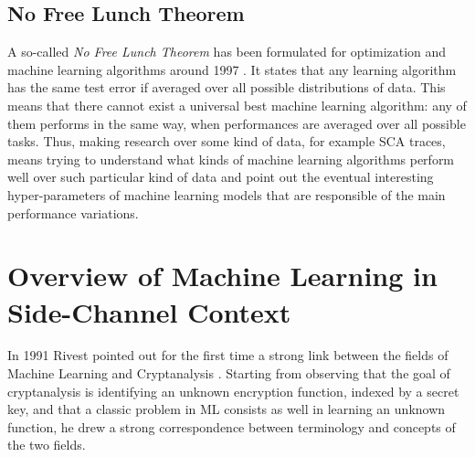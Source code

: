 \subsection{No Free Lunch Theorem}\label{sec:NFL}
A so-called \emph{No Free Lunch Theorem} has been formulated for optimization and machine learning algorithms around 1997 \cite{wolpert1997no}. It states that any learning algorithm has the same test error if averaged over all possible distributions of data. This means that there cannot exist a universal best machine learning algorithm: any of them performs in the same way, when performances are averaged over all possible tasks. Thus, making research over some kind of data, for example SCA traces, means trying to understand what kinds of machine learning algorithms perform well over such particular kind of data and point out the eventual interesting hyper-parameters of machine learning models that are responsible of the main performance variations. 




\section{Overview of Machine Learning in Side-Channel Context}
In 1991 Rivest pointed out for the first time a strong link between the fields of Machine Learning and Cryptanalysis \cite{rivest1991cryptography}. Starting from observing that the goal of cryptanalysis is identifying an unknown encryption function, indexed by a secret key, and that a classic problem in ML consists as well in learning an unknown function, he drew a strong correspondence between terminology and concepts of the two fields.\\


